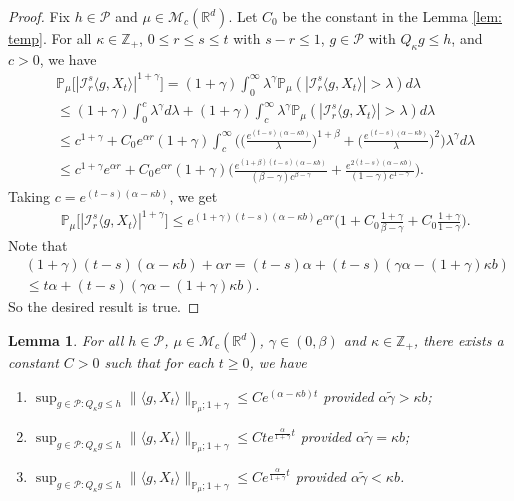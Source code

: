 \documentclass[12pt,a4paper]{amsart}
\theoremstyle{plain}
\newtheorem{lem}[thm]{Lemma}
\theoremstyle{definition}
\numberwithin{equation}{section}
\begin{document}
\begin{proof}
  Fix $h \in \mathcal P$ and $\mu \in \mathcal M_c(\mathbb R^d)$. Let $C_0$ be the constant in the Lemma \ref{lem: temp}.
  For all $\kappa \in \mathbb Z_+$,  $0\leq r\leq s\leq t$ with $s-r \leq 1$,  $g\in \mathcal P$ with $Q_{\kappa} g \leq h$, and $c>0$, we have
\begin{align}
  & \mathbb P_\mu\big[|\mathcal I_r^s\langle g, X_t\rangle|^{1+\gamma}\big]
    = (1+\gamma)\int_0^\infty \lambda^{\gamma} \mathbb P_{\mu}(|\mathcal I_r^s\langle g, X_t\rangle|>\lambda) d\lambda \\
  & \leq (1+\gamma)\int_0^c \lambda^{\gamma} d\lambda +(1+\gamma)\int_c^\infty \lambda^{\gamma}\mathbb P_\mu(|\mathcal I_r^s\langle g, X_t\rangle|> \lambda) d\lambda \\
  & \leq c^{1+\gamma} + C_0  e^{\alpha r}(1+\gamma)\int_c^\infty \bigg(\Big(\frac{e^{(t-s)(\alpha - \kappa b)}}{\lambda}\Big)^{1+\beta}+\Big(\frac{e^{(t-s)(\alpha - \kappa b)}}{\lambda}\Big)^{2}\bigg)\lambda^{\gamma}d\lambda \\
  & \leq c^{1+\gamma} e^{\alpha r} + C_0e^{\alpha r}(1+\gamma)\Big(  \frac{e^{(1+\beta)(t-s)(\alpha- \kappa b)}}{(\beta - \gamma)c^{\beta - \gamma}}  + \frac{e^{2(t-s)(\alpha- \kappa b)}}{(1 - \gamma)c^{1 - \gamma}} \Big).
\end{align}
Taking $c = e^{(t-s)(\alpha- \kappa b)}$, we get
\begin{align}
  & \mathbb P_\mu\big[|\mathcal I_r^s\langle g, X_t\rangle|^{1+\gamma}\big]
    \leq e^{(1+\gamma)(t-s)(\alpha- \kappa b)} e^{\alpha r}\Big(1+ C_0 \frac{1+\gamma}{\beta - \gamma}+ C_0 \frac{1+\gamma}{1 - \gamma}\Big).
\end{align}
Note that
\begin{align}
  & (1+\gamma) (t-s) (\alpha- \kappa b) + \alpha r
    = (t-s)\alpha+(t-s) (\gamma \alpha- (1+\gamma )\kappa b) \\
  & \leq t\alpha+(t-s) (\gamma \alpha- (1+\gamma)\kappa b).
\end{align}
So the desired result is true.
\end{proof}
\begin{lem}
  \label{lem:P:M:uc}
  For all $h \in \mathcal P$, $\mu \in \mathcal M_c(\mathbb R^d)$, $\gamma\in (0, \beta)$ and $\kappa \in \mathbb Z_+$, there exists a constant $C > 0$ such that for each $t\geq 0$, we have
  \begin{enumerate}
  \item
    \label{item:P:M:uc:1}
        $\sup_{g\in \mathcal P: Q_\kappa g \leq h}\|\langle g,X_t\rangle\|_{\mathbb{P}_{\mu};1+\gamma}\leq C e^{(\alpha-\kappa b)t}$ provided $\alpha \tilde \gamma > \kappa b$;
  \item
    \label{item:P:M:uc:2}
        $\sup_{g\in \mathcal P: Q_\kappa g \leq h}\|\langle g,X_t\rangle\|_{\mathbb{P}_{\mu};1+\gamma}\leq C te^{\frac{\alpha}{1+\gamma}t}$ provided $\alpha \tilde \gamma = \kappa b$;
  \item
    \label{item:P:M:uc:3}
       $\sup_{g\in \mathcal P: Q_\kappa g \leq h} \|\langle g,X_t\rangle\|_{\mathbb{P}_{\mu};1+\gamma}\leq C e^{\frac{\alpha}{1+\gamma}t}$ provided $\alpha \tilde \gamma < \kappa b$.
  \end{enumerate}
\end{lem}
\end{document}
